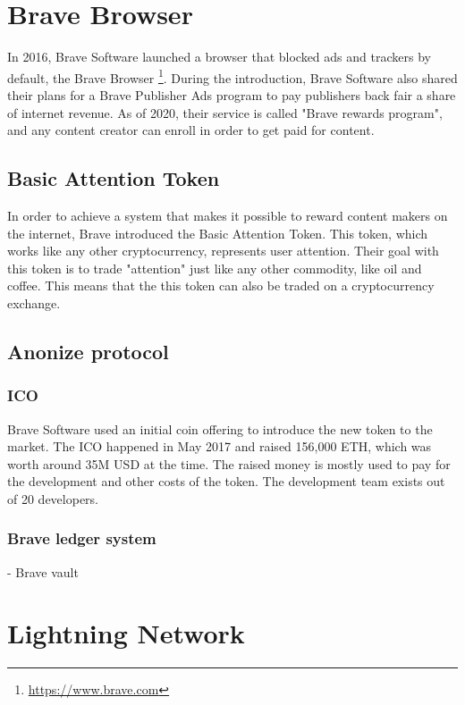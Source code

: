 \section{Brave Browser}
In 2016, Brave Software launched a browser that blocked ads and trackers by default, the Brave Browser \footnote{\url{https://www.brave.com}}. During the introduction, Brave Software also shared their plans for a Brave Publisher Ads program to pay publishers back fair a share of internet revenue. As of 2020, their service is called "Brave rewards program", and any content creator can enroll in order to get paid for content. 

\subsection{Basic Attention Token} 
In order to achieve a system that makes it possible to reward content makers on the internet, Brave introduced the Basic Attention Token. This token, which works like any other cryptocurrency, represents user attention. Their goal with this token is to trade "attention" just like any other commodity, like oil and coffee. This means that the this token can also be traded on a cryptocurrency exchange. 

\subsection{Anonize protocol}


\subsubsection{ICO}
Brave Software used an initial coin offering to introduce the new token to the market. The ICO happened in May 2017 and raised 156,000 ETH, which was worth around 35M USD at the time. The raised money is mostly used to pay for the development and other costs of the token. The development team exists out of 20 developers.

\subsubsection{Brave ledger system}

- Brave vault

\subsection{}


\section{Lightning Network}

